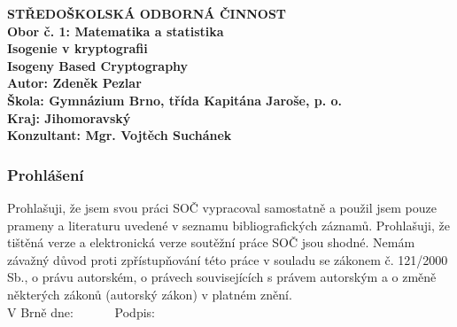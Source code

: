 \documentclass[12pt]{report}
\begin{document}
\begin{titlepage}
{
\centering
\LARGE \textbf{STŘEDOŠKOLSKÁ ODBORNÁ ČINNOST}\\
\Large\textbf{Obor č. 1: Matematika a statistika}\\
\vspace{6cm}
\LARGE\textbf{Isogenie v kryptografii}\\
\vspace{1cm}
\LARGE\textbf{Isogeny Based Cryptography}\\
}
\vspace{6cm}
{\noindent\large\bfseries Autor: Zdeněk Pezlar\\ 
	\large\bfseries Škola: Gymnázium Brno, třída Kapitána Jaroše, p. o.\\
    \large\bfseries Kraj: Jihomoravský \\
	\large\bfseries Konzultant: Mgr. Vojtěch Suchánek\\}

\end{titlepage}

\newpage
\thispagestyle{empty}
\vspace*{14cm}
\subsubsection*{Prohlášení}

Prohlašuji, že jsem svou práci SOČ vypracoval samostatně a použil jsem pouze prameny a literaturu uvedené v seznamu bibliografických záznamů.
Prohlašuji, že tištěná verze a elektronická verze soutěžní práce SOČ jsou shodné. 
Nemám závažný důvod proti zpřístupňování této práce v souladu se zákonem č. 121/2000 Sb., o právu autorském, o právech souvisejících s právem autorským a o změně některých zákonů (autorský zákon) v platném znění. \\[1cm]
V Brně dne: \dotfill \ \ \ \ \ \  Podpis: \dotfill
\end{document}
